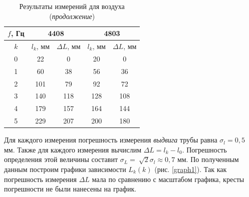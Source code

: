 \documentclass[a4paper, 12pt]{article}
\begin{document}
            \begin{table}[H]
                \centering
                
                \begin{tabular}{|c|cc|cc|}
                    \hline
                    $f$, Гц & \multicolumn{2}{c|}{4408} & \multicolumn{2}{c|}{4803} \\ \hline
                    
                    $k$ & \multicolumn{1}{c|}{$l_k$, мм} & $\Delta L$, мм & \multicolumn{1}{c|}{$l_k$, мм} & $\Delta L$, мм \\ \hline
                    
                    0 & \multicolumn{1}{c|}{22} & 0 & \multicolumn{1}{c|}{20}       & 0        \\ \hline
                    
                    1 & \multicolumn{1}{c|}{60} & 38 & \multicolumn{1}{c|}{56}       & 36 \\ \hline
                    
                    2 & \multicolumn{1}{c|}{101} & 79 & \multicolumn{1}{c|}{92} & 72 \\ \hline
                    
                    3 & \multicolumn{1}{c|}{140} & 118 & \multicolumn{1}{c|}{128} & 108 \\ \hline
                    
                    4 & \multicolumn{1}{c|}{179} & 157 & \multicolumn{1}{c|}{164} & 144 \\ \hline
                    
                    5 & \multicolumn{1}{c|}{229} & 207 & \multicolumn{1}{c|}{200} & 180 \\ \hline
                \end{tabular}
                \caption{Результаты измерений для воздуха (\textit{продолжение})}
                \label{tab:oxy2}
            \end{table}

            \noindent Для каждого измерения погрешность измерения \textit{выдвига} трубы равна $\sigma_l = 0,5$ мм. Также для каждого измерения вычислим $\Delta L = l_k - l_0$. Погрешность определения этой величины составит $\sigma_L=~\sqrt{2}\sigma_l \approx 0,7$ мм. По полученным данным построим графики зависимости $L_k(k)$ (рис. \ref{graph1}). Так как погрешность измерения $\Delta L$ мала по сравнению с масштабом графика, кресты погрешности не были нанесены на график.
\end{document}
